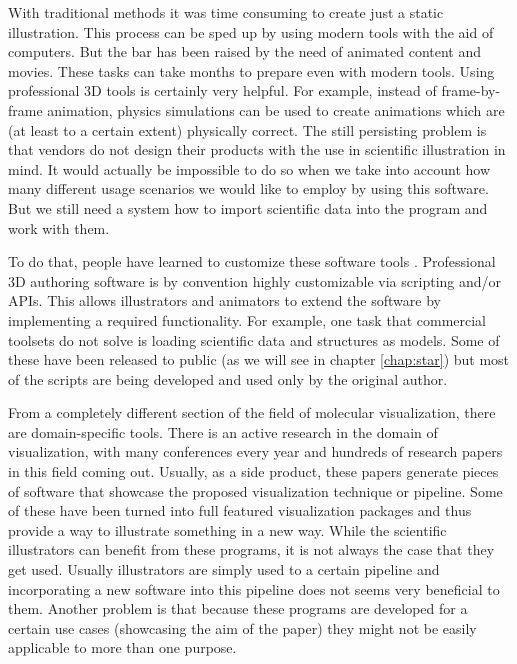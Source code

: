 \documentclass[
  digital, %
  table,   %
  nolof,     %
  nolot,     %
  oneside,
]{fithesis3}
\begin{document}
With traditional methods it was time consuming to create just a static illustration. This process can be sped up by using modern tools with the aid of computers. But the bar has been raised by the need of animated content and movies. These tasks can take months to prepare even with modern tools. Using professional 3D tools is certainly very helpful. For example, instead of frame-by-frame animation, physics simulations can be used to create animations which are (at least to a certain extent) physically correct. The still persisting problem is that vendors do not design their products with the use in scientific illustration in mind. It would actually be impossible to do so when we take into account how many different usage scenarios we would like to employ by using this software. But we still need a system how to import scientific data into the program and work with them.

To do that, people have learned to customize these software tools \cite{GrahamGaelInterview}. Professional 3D authoring software is by convention highly customizable via scripting and/or APIs. This allows illustrators and animators to extend the software by implementing a required functionality. For example, one task that commercial toolsets do not solve is loading scientific data and structures as models. Some of these have been released to public (as we will see in chapter \ref{chap:star}) but most of the scripts are being developed and used only by the original author.

From a completely different section of the field of molecular visualization, there are domain-specific tools. There is an active research in the domain of visualization, with many conferences every year and hundreds of research papers in this field coming out. Usually, as a side product, these papers generate pieces of software that showcase the proposed visualization technique or pipeline. Some of these have been turned into full featured visualization packages and thus provide a way to illustrate something in a new way. While the scientific illustrators can benefit from these programs, it is not always the case that they get used. Usually illustrators are simply used to a certain pipeline and incorporating a new software into this pipeline does not seems very beneficial to them. Another problem is that because these programs are developed for a certain use cases (showcasing the aim of the paper) they might not be easily applicable to more than one purpose.
\end{document}
